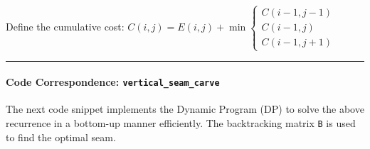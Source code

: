 \documentclass[11pt]{article}
\begin{document}
Define the cumulative cost:
\(C(i,j) = E(i,j) + \min \begin{cases} C(i-1, j-1) \\ C(i-1, j) \\ C(i-1, j+1) \end{cases}\)

\begin{center}\rule{0.5\linewidth}{0.5pt}\end{center}

\hypertarget{code-correspondence-vertical_seam_carve}{%
\paragraph{\texorpdfstring{\textbf{Code Correspondence:}
\texttt{vertical\_seam\_carve}}{Code Correspondence: vertical\_seam\_carve}}\label{code-correspondence-vertical_seam_carve}}

The next code snippet implements the Dynamic Program (DP) to solve the
above recurrence in a bottom-up manner efficiently. The backtracking
matrix \texttt{B} is used to find the optimal seam.
\end{document}
